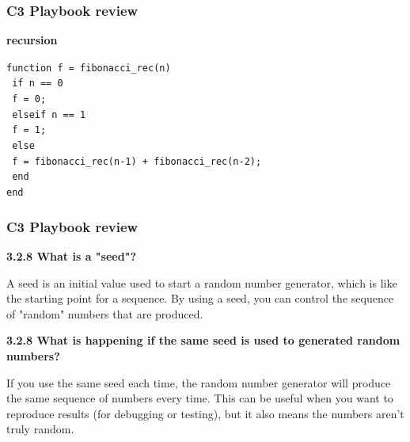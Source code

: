 \documentclass[
	11pt, %
]{beamer}
\begin{document}
\begin{frame}
	\frametitle{C3 Playbook review}

    \textbf{recursion}

    \texttt{function f = fibonacci\_rec(n)} \\
    \texttt{  \quad  if n == 0} \\
    \texttt{  \quad  \quad       f = 0;} \\
    \texttt{  \quad   elseif n == 1} \\
    \texttt{   \quad  \quad      f = 1;} \\
    \texttt{  \quad   else} \\
    \texttt{  \quad  \quad       f = fibonacci\_rec(n-1) + fibonacci\_rec(n-2);} \\
    \texttt{  \quad   end} \\
    \texttt{end}
\end{frame}
\begin{frame}
	\frametitle{C3 Playbook review}
    \textbf{3.2.8 What is a "seed"?}

    A seed is an initial value used to start a random number generator, which is like the starting point for a sequence. 
    By using a seed, you can control the sequence of "random" numbers that are produced.
    
    \textbf{3.2.8 What is happening if the same seed is used to generated random numbers?}
    
    If you use the same seed each time, the random number generator will produce the same sequence of numbers every time. 
    This can be useful when you want to reproduce results (for debugging or testing), but it also means the numbers aren't truly random. 

\end{frame}

\end{document}
